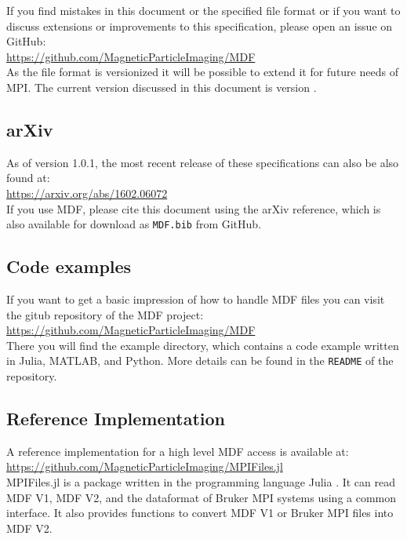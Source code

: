 \documentclass[landscape,a4paper]{article} %
\newcommand{\inlvar}[1]{{\ttfamily#1}}
\begin{document}
\begin{multicols}{2}
If you find mistakes in this document or the specified file format or if you want to discuss extensions or improvements to this specification, please open an issue on GitHub:\\
\hspace*{1cm}\url{https://github.com/MagneticParticleImaging/MDF}\\
As the file format is versionized it will be possible to extend it for future needs of MPI. The current version discussed in this document is version \version.

\subsection{arXiv}
As of version 1.0.1, the most recent release of these specifications can also be also found at:\\
\hspace*{1cm}\url{https://arxiv.org/abs/1602.06072}\\
If you use MDF, please cite this document using the arXiv reference, which is also available for download as \texttt{MDF.bib} from GitHub.


\subsection{Code examples}		 
  		  
If you want to get a basic impression of how to handle MDF files you can visit the gitub repository of the MDF project:\\		
  \hspace*{1cm}\url{https://github.com/MagneticParticleImaging/MDF}\\	
There you will find the example directory, which contains a code example written in Julia, MATLAB, and Python. More details can be found in the \texttt{README} of the repository.
 
\subsection{Reference Implementation}		 

A reference implementation for a high level MDF access is available at:\\
  \hspace*{1cm}\url{https://github.com/MagneticParticleImaging/MPIFiles.jl}\\	
\inlvar{MPIFiles.jl} \cite{knopp2019mpifiles} is a package written in the programming language Julia \cite{Bezanson2012,Bezanson2014,Bezanson2014a}. It can read MDF V1, MDF V2, and the dataformat of Bruker MPI systems using a common interface. It also provides functions to convert MDF V1 or Bruker MPI files into MDF V2.

\end{multicols}
\end{document}
